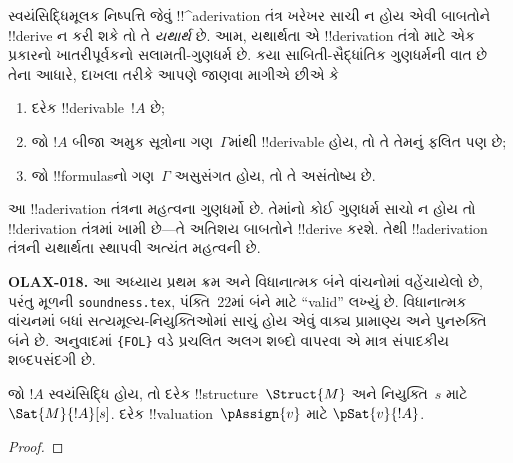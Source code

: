 \documentclass[../../../include/open-logic-section]{subfiles}
\begin{document}
      {}
      {}


\begin{explain}
સ્વયંસિદ્ધિમૂલક નિષ્પત્તિ જેવું !!^a{derivation} તંત્ર ખરેખર સાચી ન
હોય એવી બાબતોને !!{derive} ન કરી શકે તો તે \emph{યથાર્થ} છે. આમ,
યથાર્થતા એ !!{derivation} તંત્રો માટે એક પ્રકારનો ખાતરીપૂર્વકનો
સલામતી-ગુણધર્મ છે. કયા સાબિતી-સૈદ્ધાંતિક ગુણધર્મની વાત છે તેના આધારે,
દાખલા તરીકે આપણે જાણવા માગીએ છીએ કે
\begin{enumerate}
\item દરેક !!{derivable}~$!A$  છે;
\item જો $!A$ બીજા અમુક સૂત્રોના ગણ~$\Gamma$માંથી !!{derivable} હોય,
  તો તે તેમનું ફલિત પણ છે;
\item જો !!{formula}sનો ગણ~$\Gamma$ અસુસંગત હોય, તો તે અસંતોષ્ય છે.
\end{enumerate}
આ !!a{derivation} તંત્રના મહત્વના ગુણધર્મો છે. તેમાંનો કોઈ ગુણધર્મ
સાચો ન હોય તો !!{derivation} તંત્રમાં ખામી છે---તે અતિશય બાબતોને
!!{derive} કરશે. તેથી !!a{derivation} તંત્રની યથાર્થતા સ્થાપવી અત્યંત
મહત્વની છે.
\end{explain}

\begin{editorial}
\textbf{OLAX-018.} આ અધ્યાય પ્રથમ ક્રમ અને વિધાનાત્મક બંને વાંચનોમાં વહેંચાયેલો છે, પરંતુ મૂળની \texttt{soundness.tex}, પંક્તિ~22માં બંને માટે “valid” લખ્યું છે. વિધાનાત્મક વાંચનમાં બધાં સત્યમૂલ્ય-નિયુક્તિઓમાં સાચું હોય એવું વાક્ય પ્રામાણ્ય અને પુનરુક્તિ બંને છે. અનુવાદમાં \texttt{\string\iftag\{FOL\}} વડે પ્રચલિત અલગ શબ્દો વાપરવા એ માત્ર સંપાદકીય શબ્દપસંદગી છે.
\end{editorial}

\begin{prop}
  જો $!A$ સ્વયંસિદ્ધિ હોય, તો
    {દરેક !!{structure}~$\Struct{M}$ અને નિયુક્તિ~$s$ માટે $\Sat{M}{!A}[s]$.}
    {દરેક !!{valuation}~$\pAssign{v}$ માટે $\pSat{v}{!A}$.}
\end{prop}

\begin{proof}
\end{proof}
\end{document}
